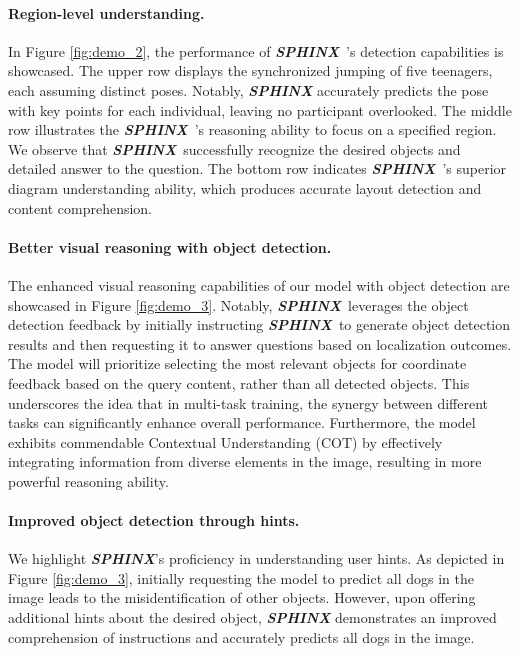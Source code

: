 \documentclass{article} \usepackage{iclr2024_conference,times}
\newcommand{\sphinx}{\textcolor{Goldenrod3}{\textbf{\textit{SPHINX}}}~}
\begin{document}
\paragraph{Region-level understanding.}
In Figure \ref{fig:demo_2}, the performance of \sphinx's detection capabilities is showcased. The upper row displays the synchronized jumping of five teenagers, each assuming distinct poses. Notably, \textcolor{Goldenrod3}{\textbf{\textit{SPHINX}}} accurately predicts the pose with key points for each individual, leaving no participant overlooked. 
The middle row illustrates the \sphinx's reasoning ability to focus on a specified region. We observe that \sphinx successfully recognize the desired objects and detailed answer to the question. 
The bottom row indicates \sphinx's superior diagram understanding ability, which produces accurate layout detection and content comprehension.














\paragraph{Better visual reasoning with object detection.}
The enhanced visual reasoning capabilities of our model with object detection are showcased in Figure \ref{fig:demo_3}. Notably, \sphinx leverages the object detection feedback by initially instructing \sphinx to generate object detection results and then requesting it to answer questions based on localization outcomes. The model will prioritize selecting the most relevant objects for coordinate feedback based on the query content, rather than all detected objects. This underscores the idea that in multi-task training, the synergy between different tasks can significantly enhance overall performance. Furthermore, the model exhibits commendable Contextual Understanding (COT) by effectively integrating information from diverse elements in the image, resulting in more powerful reasoning ability.



\paragraph{Improved object detection through hints.}
We highlight \textcolor{Goldenrod3}{\textbf{\textit{SPHINX}}}'s proficiency in understanding user hints. As depicted in Figure \ref{fig:demo_3}, initially requesting the model to predict all dogs in the image leads to the misidentification of other objects. However, upon offering additional hints about the desired object, \textcolor{Goldenrod3}{\textbf{\textit{SPHINX}}} demonstrates an improved comprehension of instructions and accurately predicts all dogs in the image.
\end{document}
